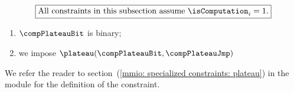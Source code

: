 \[
    \boxed{\text{All constraints in this subsection assume } \isComputation _{i} = 1.}
\]

\begin{enumerate}
    \item $\compPlateauBit$ is binary;
    \item we impose $\plateau( \compPlateauBit, \compPlateauJmp)$
\end{enumerate}
We refer the reader to section~(\ref{mmio: specialized constraints: plateau}) in the \mmioMod{} module for the definition of the \plateau{} constraint.